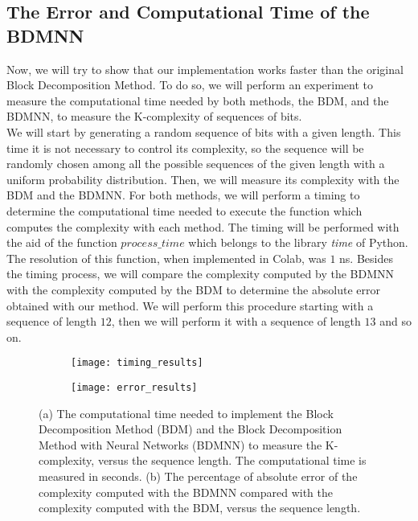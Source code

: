 \subsection{The Error and Computational Time of the BDMNN}
Now, we will try to show that our implementation works faster than the original Block Decomposition Method. To do so, we will perform an experiment to measure the computational time needed by both methods, the BDM, and the BDMNN, to measure the K-complexity of sequences of bits.\\

We will start by generating a random sequence of bits with a given length. This time it is not necessary to control its complexity, so the sequence will be randomly chosen among all the possible sequences of the given length with a uniform probability distribution. Then, we will measure its complexity with the BDM and the BDMNN. For both methods, we will perform a timing to determine the computational time needed to execute the function which computes the complexity with each method. The timing will be performed with the aid of the function $process \_ time$ which belongs to the library \textit{time} of Python. The resolution of this function, when implemented in Colab, was $1$ ns. Besides the timing process, we will compare the complexity computed by the BDMNN with the complexity computed by the BDM to determine the absolute error obtained with our method. We will perform this procedure starting with a sequence of length $12$, then we will perform it with a sequence of length $13$ and so on.\\

\begin{figure}
	\centering
	\begin{subfigure}[b]{0.8\textwidth}
		\centering
		\texttt{[image: timing\_results]}
		\caption{}
		\label{fig:timing_results}
	\end{subfigure}
	\hspace{0.001mm}
	\begin{subfigure}[b]{0.8\textwidth}
		\centering
		\texttt{[image: error\_results]}
		\caption{}
		\label{fig:error_results}
	\end{subfigure}
	\caption[Computational time and absolute error obtained with the BDMNN.]{(a) The computational time needed to implement the Block Decomposition Method (BDM) and the Block Decomposition Method with Neural Networks (BDMNN) to measure the K-complexity, versus the sequence length. The computational time is measured in seconds. (b) The percentage of absolute error of the complexity computed with the BDMNN compared with the complexity computed with the BDM, versus the sequence length.}
	\label{fig:tim_error_results}
\end{figure}

